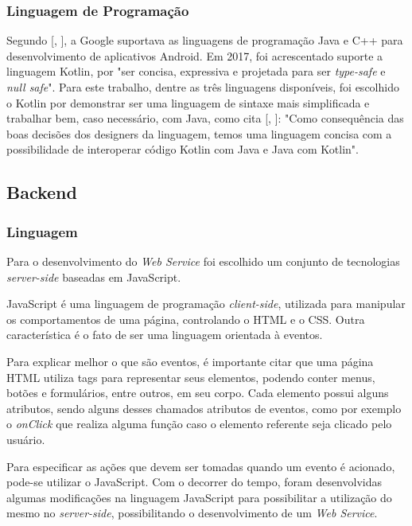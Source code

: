 \documentclass[
	12pt,				%
	oneside,			%
	a4paper,			%
	brazil				%
]{abntex2}
\newcommand{\citecustom}[1]{[\citeauthoronline{#1}, \citeyear{#1}]}
\begin{document}
\subsubsection{Linguagem de Programação}

Segundo \citecustom{Avram2017}, a Google suportava as linguagens de programação Java e C++ para desenvolvimento de aplicativos Android. Em 2017, foi acrescentado suporte a linguagem Kotlin, por "ser concisa, expressiva e projetada para ser \textit{type-safe} e \textit{null safe}".
Para este trabalho, dentre as três linguagens disponíveis, foi escolhido o Kotlin por demonstrar ser uma linguagem de sintaxe mais simplificada e trabalhar bem, caso necessário, com Java, como cita \citecustom{Kewerson2017}: "Como consequência das boas decisões dos designers da linguagem, temos uma linguagem concisa com a possibilidade de interoperar código Kotlin com Java e Java com Kotlin".

\subsection{Backend}

\subsubsection{Linguagem}

Para o desenvolvimento do \textit{Web Service} foi escolhido um conjunto de tecnologias \textit{server-side} baseadas em JavaScript.


JavaScript é uma linguagem de programação \textit{client-side}, utilizada para manipular os comportamentos de uma página, controlando o HTML e o CSS. Outra característica é o fato de ser uma linguagem orientada à eventos.

Para explicar melhor o que são eventos, é importante citar que uma página HTML utiliza tags para representar seus elementos, podendo conter menus, botões e formulários, entre outros, em seu corpo. Cada elemento possui alguns atributos, sendo alguns desses chamados atributos de eventos, como por exemplo o \textit{onClick} que realiza alguma função caso o elemento referente seja clicado pelo usuário.

Para especificar as ações que devem ser tomadas quando um evento é acionado, pode-se utilizar o JavaScript. Com o decorrer do tempo, foram desenvolvidas algumas modificações na linguagem JavaScript para possibilitar a utilização do mesmo no \textit{server-side}, possibilitando o desenvolvimento de um \textit{Web Service}. 
\end{document}
